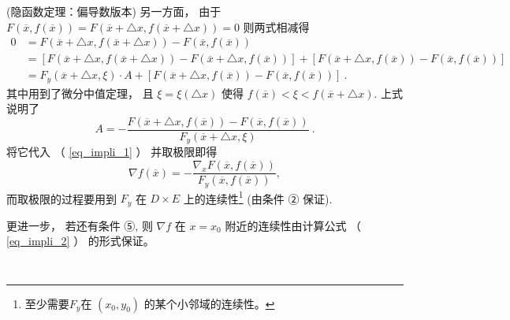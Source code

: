 \begin{theorem}{(隐函数定理：偏导数版本)}
另一方面， 由于 $F(\overline{x},f(\overline{x}))=F(\overline{x}+\triangle x,f(\overline{x}+\triangle x))=0$
则两式相减得
\begin{equation}
\begin{aligned}
0 & = F(\overline{x}+\triangle x,f(\overline{x}+\triangle x))-F(\overline{x},f(\overline{x}))\\
 & = \left[F(\overline{x}+\triangle x,f(\overline{x}+\triangle x))-F(\overline{x}+\triangle x,f(\overline{x}))\right]+\left[F(\overline{x}+\triangle x,f(\overline{x}))-F(\overline{x},f(\overline{x}))\right]\\
 & = F_{y}(\overline{x}+\triangle x,\xi)\cdot A+\left[F(\overline{x}+\triangle x,f(\overline{x}))-F(\overline{x},f(\overline{x}))\right]~.
\end{aligned}
\end{equation}
其中用到了微分中值定理， 且 $\xi=\xi(\triangle x)$ 使得 $f(\overline{x})<\xi<f(\overline{x}+\triangle x)$.
上式说明了 
\[
A=-{\displaystyle \frac{F(\overline{x}+\triangle x,f(\overline{x}))-F(\overline{x},f(\overline{x}))}{F_{y}(\overline{x}+\triangle x,\xi)}}~.
\]
将它代入 （ \autoref{eq_impli_1} ） 并取极限即得 
\begin{equation}\label{eq_impli_2}
\nabla f(\overline{x})=-{\displaystyle \frac{\nabla_{x}F(\overline{x},f(\overline{x}))}{F_{y}(\overline{x},f(\overline{x}))},}
\end{equation}
而取极限的过程要用到 $F_{y}$ 在 $D\times E$ 上的连续性\footnote{至少需要$F_y$在 $(x_0,y_0)$ 的某个小邻域的连续性。} (由条件 ② 保证). 

更进一步， 若还有条件 ⑤, 则 $\nabla f$ 在 $x=x_{0}$ 附近的连续性由计算公式 （ \autoref{eq_impli_2} ） 的形式保证。 
 \end{theorem}

\verb| |

